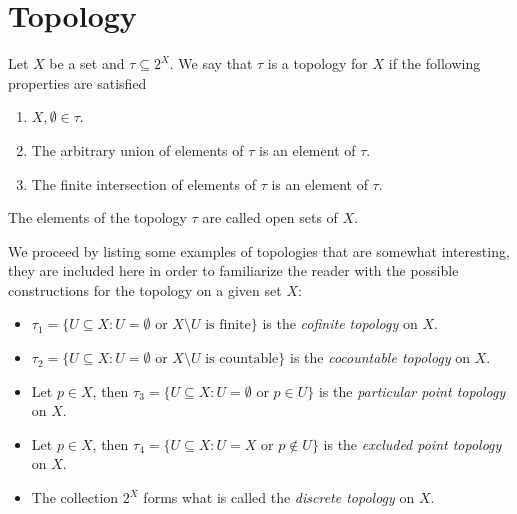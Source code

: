 \section{Topology}

\begin{definition}[Topology]\label{def:topology}
Let \(X\) be a set and \(\tau \subseteq 2^X\). We say that \(\tau\)
is a topology for \(X\) if the following properties are satisfied
\begin{enumerate}[(T1)]\setlength\itemsep{0em}
\item\label{item:topology-T1}
  \(X, \emptyset \in \tau\).

\item\label{item:topology-T2}
  The arbitrary union of elements of \(\tau\) is an element of
  \(\tau\).

\item\label{item:topology-T3}
  The finite intersection of elements of \(\tau\) is an element of
  \(\tau\).
\end{enumerate}
The elements of the topology \(\tau\) are called open sets of \(X\).
\end{definition}

\begin{example}\label{exp:some-topologies}
We proceed by listing some examples of topologies that are somewhat interesting,
they are included here in order to familiarize the reader with the possible
constructions for the topology on a given set \(X\):
\begin{itemize}\setlength\itemsep{0em}
\item \(\tau_1 = \{U \subseteq X \colon U = \emptyset \text{ or
  } X \setminus U \text{ is finite}\}\) is the \emph{cofinite topology} on \(X\).

\item \(\tau_2 = \{U \subseteq X \colon U = \emptyset \text{ or } X \setminus U
  \text{ is countable}\}\) is the \emph{cocountable topology} on \(X\).

\item Let \(p \in X\), then \(\tau_3 = \{U \subseteq X \colon U = \emptyset
  \text{ or } p \in U\}\) is the \emph{particular point topology} on \(X\).

\item Let \(p \in X\), then \(\tau_4 = \{U \subseteq X \colon U = X \text{ or }
  p \not\in U\}\) is the \emph{excluded point topology} on \(X\).
\item The collection \(2^X\) forms what is called the \emph{discrete topology}
  on \(X\).
\end{itemize}
\end{example}


